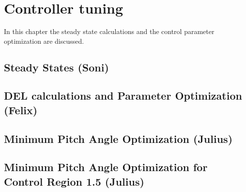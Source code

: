 \chapter{Controller tuning}
In this chapter the steady state calculations and the control parameter optimization are discussed.
\section{Steady States (Soni)} \label{steady states}


\section{DEL calculations and Parameter Optimization (Felix)} \label{DLC 1.2 tuning}


\section{Minimum Pitch Angle Optimization (Julius)} \label{minimum pitch angle static}


\section{Minimum Pitch Angle Optimization for Control Region 1.5 (Julius)} 

